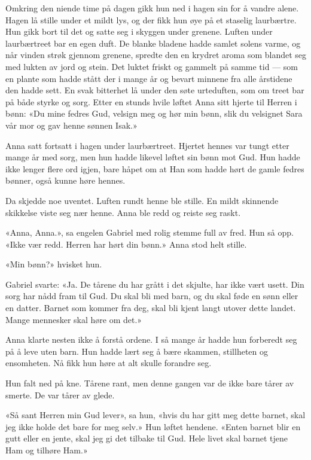     Omkring den niende time på dagen gikk hun ned
    i hagen sin for å vandre alene. Hagen lå stille
    under et mildt lys, og der fikk hun øye på et staselig laurbærtre.
    Hun gikk bort til det og satte seg i skyggen under grenene.
    Luften under laurbærtreet bar en egen duft. De blanke bladene
    hadde samlet solens varme, og når vinden strøk gjennom grenene,
    spredte den en krydret aroma som blandet seg med lukten av
    jord og stein. Det luktet friskt og gammelt på samme tid ---
    som en plante som hadde stått der i mange år
    og bevart minnene fra alle årstidene den hadde sett.
    En svak bitterhet lå under den søte urteduften,
    som om treet bar på både styrke og sorg.
    Etter en stunds hvile løftet Anna sitt hjerte til Herren i bønn:    
    «Du mine fedres Gud, velsign meg og hør min bønn,
    slik du velsignet Sara vår mor og gav henne sønnen Isak.»


    
    Anna satt fortsatt i hagen under laurbærtreet.
    Hjertet hennes var tungt etter mange år med sorg,
    men hun hadde likevel løftet sin bønn mot Gud.
    Hun hadde ikke lenger flere ord igjen,
    bare håpet om at Han som hadde hørt de gamle fedres bønner,
    også kunne høre hennes.


    

Da skjedde noe uventet.
Luften rundt henne ble stille.
En mildt skinnende skikkelse viste seg nær henne.
Anna ble redd og reiste seg raskt.

«Anna, Anna.», sa engelen Gabriel med rolig stemme full av fred.
Hun så opp. «Ikke vær redd. Herren har hørt din bønn.»
Anna stod helt stille.

«Min bønn?» hvisket hun.

Gabriel svarte: «Ja. De tårene du har grått i det skjulte,
har ikke vært usett. Din sorg har nådd fram til Gud.
Du skal bli med barn, og du skal føde en sønn eller en datter.
Barnet som kommer fra deg, skal bli kjent langt utover dette landet.
Mange mennesker skal høre om det.»

Anna klarte nesten ikke å forstå ordene.
I så mange år hadde hun forberedt seg på å leve uten barn.
Hun hadde lært seg å bære skammen, stillheten og ensomheten.
Nå fikk hun høre at alt skulle forandre seg.

Hun falt ned på kne.
Tårene rant, men denne gangen var de ikke bare tårer av smerte.
De var tårer av glede.

«Så sant Herren min Gud lever», sa hun, «hvis du har gitt meg dette barnet,
skal jeg ikke holde det bare for meg selv.»
Hun løftet hendene.
«Enten barnet blir en gutt eller en jente, skal jeg gi det tilbake til Gud.
Hele livet skal barnet tjene Ham og tilhøre Ham.»

